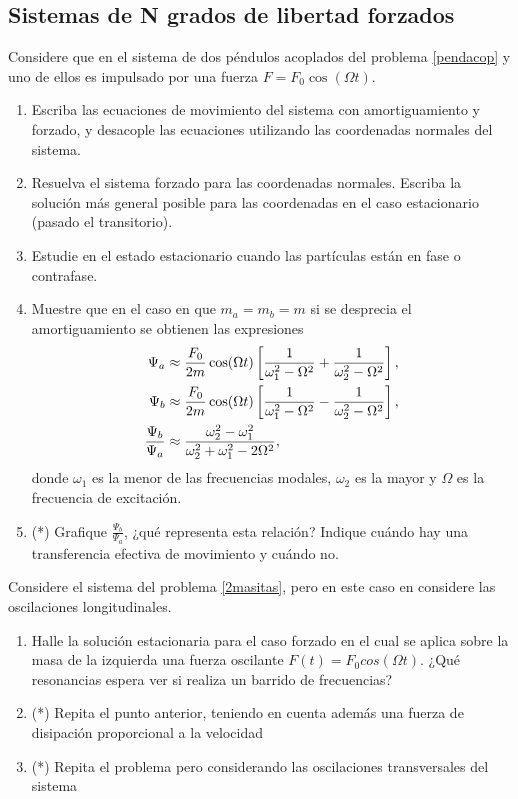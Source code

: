 \subsection*{Sistemas de N grados de libertad forzados}


\item Considere que en el sistema de dos péndulos acoplados del problema \ref{pendacop} y uno de ellos es impulsado por una fuerza $F= F_0 \cos(\Omega t)$.  
\begin{enumerate}
	\item Escriba las ecuaciones de movimiento del sistema con amortiguamiento y forzado, y desacople las ecuaciones utilizando las coordenadas normales del sistema.
	\item Resuelva el sistema forzado para las coordenadas normales. Escriba la solución más general posible para las coordenadas en el caso estacionario (pasado el transitorio).
	\item Estudie en el estado estacionario cuando las partículas están en fase o contrafase.
	\item Muestre que en el caso en que $m_a= m_b= m$ si se desprecia el amortiguamiento se obtienen las expresiones
	\[
		\begin{aligned}
			\Psi_a &\approx \frac{F_0}{2m} \cos(\Omega t) \left[ \frac{1}{\omega_1^2 - \Omega^2 } + \frac{1}{\omega_2^2 -\Omega^2} \right], \notag \\
			\Psi_b &\approx \frac{F_0}{2m} \cos(\Omega t) \left[ \frac{1}{\omega_1^2 - \Omega^2 } - \frac{1}{\omega_2^2 -\Omega^2} \right], \notag \\
			\frac{\Psi_b}{\Psi_a} &\approx \frac{\omega_2^2 - \omega_1^2}{\omega_2^2 + \omega_1^2 - 2 \Omega^2}, \notag
		\end{aligned}
	\]
	donde $\omega_1$ es la menor de las frecuencias modales, $\omega_2$ es la mayor y $\Omega$ es la frecuencia de excitación.
	\item (*) Grafique $\frac{\Psi_b}{\Psi_a}$, ¿qué representa esta relación?
	Indique cuándo hay una transferencia efectiva de movimiento y cuándo no.
\end{enumerate}


\item Considere el sistema del problema \ref{2masitas}, pero en este caso en considere las oscilaciones longitudinales.
\begin{enumerate}
    \item Halle la solución estacionaria para el caso forzado en el cual se aplica sobre la masa de la izquierda una fuerza oscilante $F(t)= F_0 cos(\Omega t)$.
		¿Qué resonancias espera ver si realiza un barrido de frecuencias?
		\item (*) Repita el punto anterior, teniendo en cuenta además una fuerza de disipación proporcional a la velocidad
		\item (*) Repita el problema pero considerando las oscilaciones transversales del sistema
\end{enumerate}



